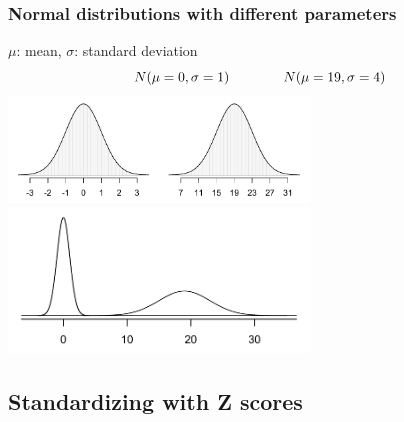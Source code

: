 \begin{frame}
\frametitle{Normal distributions with different parameters}

\vspace{-0.5cm}
\begin{center}
$\mu$: mean, $\sigma$: standard deviation
\[N(\mu = 0, \sigma = 1) \hspace{1.4cm} N(\mu = 19, \sigma = 4) \]
\includegraphics[width=0.6\textwidth]{3-1_normal_distribution/figures/twoSampleNormals/twoSampleNormals} \\
\includegraphics[width=0.6\textwidth]{3-1_normal_distribution/figures/twoSampleNormalsStacked/twoSampleNormalsStacked}
\end{center}

\end{frame}


\subsection{Standardizing with Z scores}


